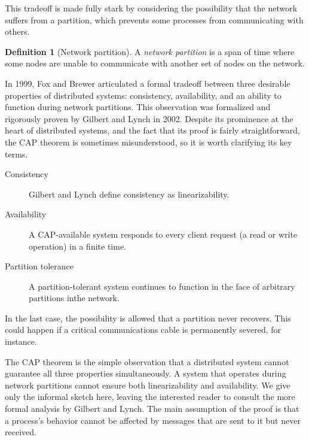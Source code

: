 \documentclass[]             %
{NASA}                       %
\theoremstyle{definition}
\newtheorem{definition}[theorem]{Definition}
\begin{document}
This tradeoff is made fully stark by considering the possibility that
the network suffers from a partition, which prevents some processes
from communicating with others.

\begin{definition}[Network partition] A \emph{network partition} is a
span of time where some nodes are unable to communicate with another
set of nodes on the network.
\end{definition}

In 1999, Fox and Brewer \cite{1999foxbrewer} articulated a formal
tradeoff between three desirable properties of distributed systems:
consistency, availability, and an ability to function during network
partitions. This observation was formalized and rigorously proven by
Gilbert and Lynch \cite{2002gilbertlynchCAP} in 2002. Despite its
prominence at the heart of distributed systems, and the fact that its
proof is fairly straightforward, the CAP theorem is sometimes
misunderstood, so it is worth clarifying its key terms.

\begin{description}
\item[Consistency] Gilbert and Lynch define consistency as
  linearizability.
\item[Availability] A CAP-available system responds to every client
  request (a read or write operation) in a finite time.
\item[Partition tolerance] A partition-tolerant system continues to
  function in the face of arbitrary partitions inthe network.
\end{description}

In the last case, the possibility is allowed that a partition never
recovers. This could happen if a critical communications cable is
permanently severed, for instance.

The CAP theorem is the simple observation that a distributed system
cannot guarantee all three properties simultaneously. A system that
operates during network partitions cannot ensure both linearizability
and availability. We give only the informal sketch here, leaving the
interested reader to consult the more formal analysis by Gilbert and
Lynch. The main assumption of the proof is that a process's behavior
cannot be affected by messages that are sent to it but never received.
\end{document}
